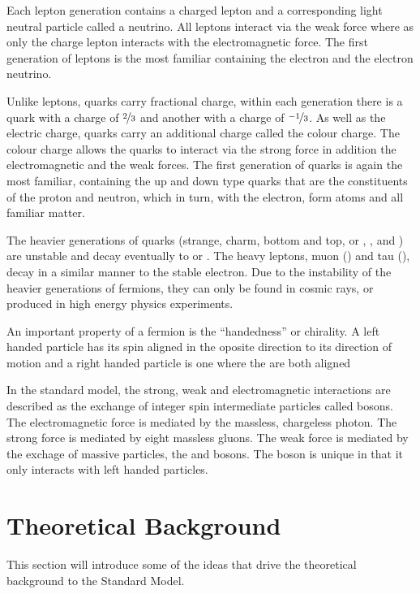 Each lepton generation contains a charged lepton and a corresponding light
neutral particle called a neutrino. All leptons interact via the weak force
where as only the charge lepton interacts with the electromagnetic force.  The
first generation of leptons is the most familiar containing the electron and the
electron neutrino.

Unlike leptons, quarks carry fractional charge, within each generation there is
a quark with a charge of $\nicefrac{2}{3}$ and another with a charge of
$\nicefrac{-1}{3}$. As well as the electric charge, quarks carry an additional
charge called the colour charge. The colour charge allows the quarks to interact
via the strong force in addition the electromagnetic and the weak forces.
The first generation of quarks is again the most familiar, containing the up and
down type quarks that are the constituents of the proton and neutron, which in
turn, with the electron, form atoms and all familiar matter.


The heavier generations of quarks (strange, charm, bottom and top, or \Pstrange,
\Pcharm, \Pbottom and \Ptop) are unstable and decay eventually to \Pup or
\Pdown.
The heavy leptons, muon (\Pmuon) and tau (\Ptau), decay in a similar manner to
the stable electron. 
Due to the instability of the heavier generations of fermions, they can only be
found in  cosmic rays, or produced in high energy physics experiments.

An important property of a fermion is the ``handedness'' or chirality. A left
handed particle has its spin aligned in the oposite direction to its direction
of motion and a right handed particle is one where the are both aligned

In the standard model, the strong, weak and electromagnetic interactions are
described as the exchange of integer spin intermediate particles called bosons.
The electromagnetic force is mediated by the massless, chargeless photon. The
strong force is mediated by eight massless gluons. 
The weak force is mediated by the exchage of massive particles, the \PWpm and \PZ
bosons. The \PWpm boson is unique in that it only interacts with left handed
particles.



\section{Theoretical Background}
This section will introduce some of the ideas that drive the
theoretical background to the Standard Model.

